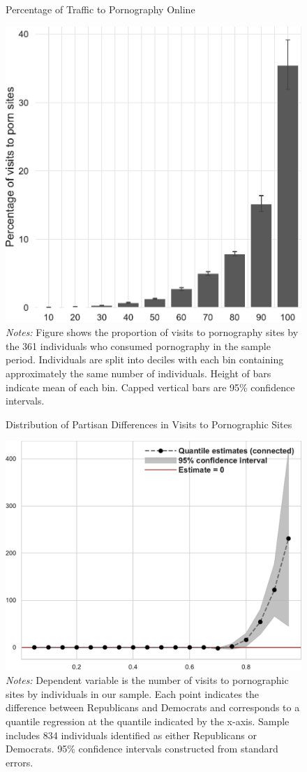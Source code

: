 \documentclass[12pt, letterpaper]{article}
\begin{document}
\begin{figure}
	\centering
	\caption{Percentage of Traffic to Pornography Online}
	\includegraphics[width=.5\linewidth]{../figs/distribution_proportion_visits_to_adultsites.pdf}
	\caption*{\footnotesize \emph{Notes:} 
		Figure shows the proportion of visits to pornography sites by the 361 individuals who consumed pornography in the sample period.
		Individuals are split into deciles with each bin containing approximately the same number of individuals.
		Height of bars indicate mean of each bin.
		Capped vertical bars are 95\% confidence intervals.
	}
	\label{fig:distribution_prop_visits}
\end{figure}

\begin{figure}
	\centering
	\caption{Distribution of Partisan Differences in Visits to Pornographic Sites}
	\includegraphics[width=.6\linewidth]{../figs/quantile_reg_visits_adult.pdf}
	\caption*{\footnotesize \emph{Notes:} 
		Dependent variable is the number of visits to pornographic sites by individuals in our sample.
		Each point indicates the difference between Republicans and Democrats and corresponds to a quantile regression at the quantile indicated by the x-axis.
		Sample includes 834 individuals identified as either Republicans or Democrats.
		95\% confidence intervals constructed from standard errors.
	}
	\label{fig:quantile_regression_visits}
\end{figure}
\end{document}
